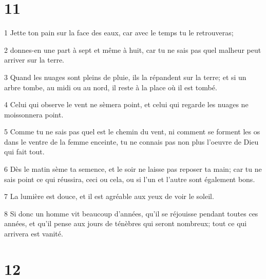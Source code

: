 \chapter{11}

\par 1 Jette ton pain sur la face des eaux, car avec le temps tu le retrouveras;
\par 2 donnes-en une part à sept et même à huit, car tu ne sais pas quel malheur peut arriver sur la terre.
\par 3 Quand les nuages sont pleins de pluie, ils la répandent sur la terre; et si un arbre tombe, au midi ou au nord, il reste à la place où il est tombé.
\par 4 Celui qui observe le vent ne sèmera point, et celui qui regarde les nuages ne moissonnera point.
\par 5 Comme tu ne sais pas quel est le chemin du vent, ni comment se forment les os dans le ventre de la femme enceinte, tu ne connais pas non plus l'oeuvre de Dieu qui fait tout.
\par 6 Dès le matin sème ta semence, et le soir ne laisse pas reposer ta main; car tu ne sais point ce qui réussira, ceci ou cela, ou si l'un et l'autre sont également bons.
\par 7 La lumière est douce, et il est agréable aux yeux de voir le soleil.
\par 8 Si donc un homme vit beaucoup d'années, qu'il se réjouisse pendant toutes ces années, et qu'il pense aux jours de ténèbres qui seront nombreux; tout ce qui arrivera est vanité.

\chapter{12}

